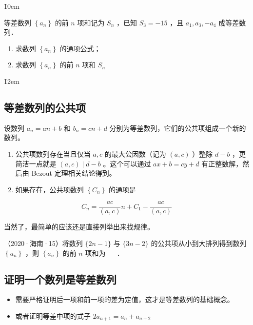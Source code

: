 \v{10em}

\begin{example}
    等差数列 $\left\{a_n\right\}$ 的前 $n$ 项和记为 $S_n$ ，已知 $S_3=-15$ ，且 $a_1, a_3,-a_4$ 成等差数列．
    \begin{enumerate}
        \item 求数列 $\left\{a_n\right\}$ 的通项公式；
        \item 求数列 $\left\{a_n\right\}$ 的前 $n$ 项和 $S_n$
    \end{enumerate}
\end{example}

\v{12em}

\subsection{等差数列的公共项}

\begin{theorem}[等差数列的公共项]
    设数列 $a_n=an+b$ 和 $b_n=cn+d$ 分别为等差数列，它们的公共项组成一个新的数列。
    \begin{enumerate}
        \item 公共项数列存在当且仅当 $a, c$ 的最大公因数（记为 $(a, c)$ ）整除 $d-b$ ，更简洁一点就是 $(a, c) \mid d-b$ 。这个可以通过 $a x+b=c y+d$ 有正整数解，然后由 Bezout 定理相关结论得到。
        \item 如果存在，公共项数列 $\left\{C_n\right\}$ 的通项是
    \end{enumerate}
    $$
        C_n=\frac{a c}{(a, c)} n+C_1-\frac{a c}{(a, c)}
    $$
\end{theorem}

\begin{tips}
    当然了，最简单的应该还是直接列举出来找规律。
\end{tips}

\begin{example}
    （2020·海南·15）将数列 $\{2 n-1\}$ 与 $\{3 n-2\}$ 的公共项从小到大排列得到数列 $\left\{a_n\right\}$ ，则 $\left\{a_n\right\}$ 的前 $n$ 项和为 \underline{$\quad$} ．
\end{example}

\vspace{6em}

\subsection{证明一个数列是等差数列}

\begin{theorem}
    \begin{itemize}
        \item 需要严格证明后一项和前一项的差为定值，这才是等差数列的基础概念。
        \item 或者证明等差中项的式子 $2 a_{n+1} = a_{n} + a_{n+2}$
    \end{itemize}
\end{theorem}

